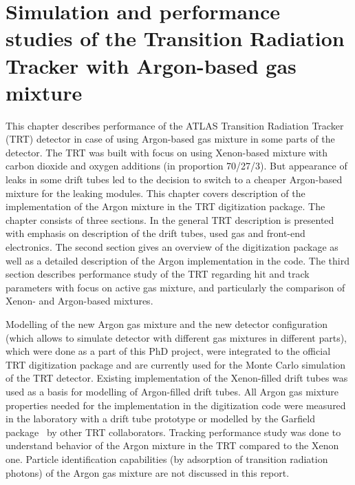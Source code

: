 \chapter{Simulation and performance studies of the Transition Radiation Tracker with Argon-based gas mixture}
\label{chap:TRT}


This chapter describes performance of the ATLAS Transition Radiation Tracker (TRT) detector in case of using 
Argon-based gas mixture in some parts of the detector.
The TRT was built with focus on using Xenon-based mixture with carbon dioxide and oxygen additions (in proportion 70/27/3).
But appearance of leaks in some drift tubes led to the decision to switch to a cheaper Argon-based mixture for the leaking modules.
This chapter covers description of the implementation of the Argon mixture in the TRT digitization package.
The chapter consists of three sections. In  the general TRT description is presented with emphasis
on description of the drift tubes, used gas and front-end electronics.
The second section gives an overview of the digitization package as well as a detailed description of the Argon implementation in the code.
The third section describes performance study of the TRT regarding hit and track parameters with focus on active gas mixture, and particularly the comparison of 
Xenon- and Argon-based mixtures.

Modelling of the new Argon gas mixture and the new detector configuration (which allows to simulate detector with different gas mixtures in different parts), 
which were done as a part of this PhD project, were integrated to the official TRT digitization package and are currently used for the Monte Carlo simulation of the TRT detector. 
Existing implementation of the Xenon-filled drift tubes was used as a basis for modelling of Argon-filled drift tubes.
All Argon gas mixture properties needed for the implementation in the digitization code were measured in the laboratory with a drift tube prototype 
or modelled by the Garfield package~\cite{garfield_program} by other TRT collaborators.
Tracking performance study was done to understand behavior of the Argon mixture in the TRT compared to the Xenon one.
Particle identification capabilities (by adsorption of transition radiation photons) of the Argon gas mixture are not discussed in this report.

